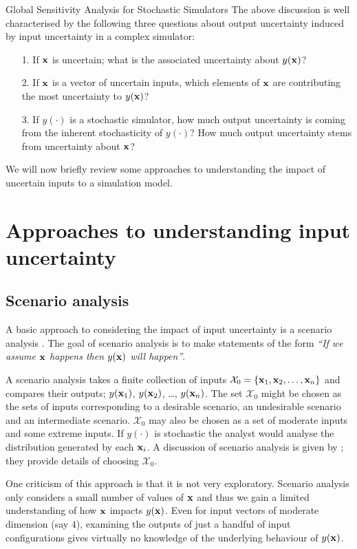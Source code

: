 \begin{chapter}{Global Sensitivity Analysis for Stochastic Simulators\label{Ch:sensitivity}}
The above discussion is well characterised by the following three questions about output uncertainty induced by input uncertainty in a complex simulator:
\begin{itemize}
    \item[1.] If $\mathbf{x}$ is uncertain; what is the associated uncertainty about $y(\mathbf{x})$?
    \item[2.] If $\mathbf{x}$ is a vector of uncertain inputs, which elements of $\mathbf{x}$ are contributing the most uncertainty to $y(\mathbf{x})$?
    \item[3.] If $y(\cdot)$ is a stochastic simulator, how much output uncertainty is coming from the inherent stochasticity of $y(\cdot)$? How much output uncertainty stems from uncertainty about $\mathbf{x}$?
\end{itemize}

We will now briefly review some approaches to understanding the impact of uncertain inputs to a simulation model.

\section{Approaches to understanding input uncertainty}

\subsection{Scenario analysis}

A basic approach to considering the impact of input uncertainty is a scenario analysis \citep{Zhang2012, Grewal2013}. The goal of scenario analysis is to make statements of the form \textit{``If we assume $\mathbf{x}$ happens then $y(\mathbf{x})$ will happen''}.

A scenario analysis takes a finite collection of inputs $\mathcal{X}_0 = \{ \mathbf{x}_1, \mathbf{x}_2, \ldots, \mathbf{x}_n\}$  and compares their outputs; $y(\mathbf{x}_1)$, $y(\mathbf{x}_2)$, \ldots, $y(\mathbf{x}_n)$. The set $\mathcal{X}_0$ might be chosen as the sets of inputs corresponding to a desirable scenario, an undesirable scenario and an intermediate scenario. $\mathcal{X}_0$ may also be chosen as a set of moderate inputs and some extreme inputs. If $y(\cdot)$ is stochastic the analyst would analyse the distribution generated by each $\mathbf{x}_i$. A discussion of scenario analysis is given by \citet{Wheatcroft2019}; they provide details of choosing $\mathcal{X}_0$.

One criticism of this approach is that it is not very exploratory. Scenario analysis only considers a small number of values of $\mathbf{x}$ and thus we gain a limited understanding of how $\mathbf{x}$ impacts $y(\mathbf{x})$. Even for input vectors of moderate dimension (say $4$), examining the outputs of just a handful of input configurations gives virtually no knowledge of the underlying behaviour of $y(\mathbf{x})$.


\end{chapter}
